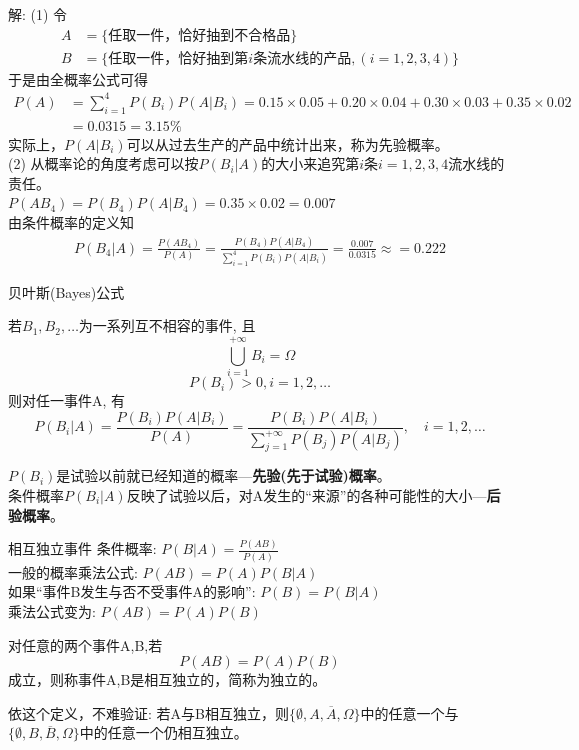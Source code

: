 \begin{frame}[shrink]
解: (1) 令
\begin{align*}
A&=\{\text{任取一件，恰好抽到不合格品} \}\\
B&=\{\text{任取一件，恰好抽到第$i$条流水线的产品}, (i=1,2,3,4) \}
\end{align*}
于是由全概率公式可得
\begin{align*}
P(A)&=\sum\limits_{i=1}^4P(B_i)P(A|B_i)=0.15\times 0.05+0.20\times 0.04+0.30\times 0.03+0.35\times 0.02\\
&=0.0315=3.15\%
\end{align*}
实际上，$P(A|B_i)$可以从过去生产的产品中统计出来，称为先验概率。\\
(2) 从概率论的角度考虑可以按$P(B_i|A)$的大小来追究第$i$条$i=1,2,3,4$流水线的责任。\\
$P(AB_4)=P(B_4)P(A|B_4)=0.35\times 0.02=0.007$\\
由条件概率的定义知
\begin{align*}
P(B_4|A)=\frac{P(AB_4)}{P(A)}=\frac{P(B_4)P(A|B_4)}{\sum\limits_{i=1}^4P(B_i)P(A|B_i)}=\frac{0.007}{0.0315}\approx=0.222
\end{align*}
\end{frame}

\begin{frame}{贝叶斯(Bayes)公式}
\begin{theorem}
	若$B_1, B_2, \dots$为一系列互不相容的事件, 且
	\[\bigcup\limits_{i=1}^{+\infty}B_i=\Omega \]
	\[P(B_i)>0, i=1,2,\dots \]
	则对任一事件A, 有
	\[P(B_i|A)=\frac{P(B_i)P(A|B_i)}{P(A)}=\frac{P(B_i)P(A|B_i)}{\sum\limits_{j=1}^{+\infty}P(B_j)P(A|B_j)}, \quad i=1,2,\dots \]
\end{theorem}
$P(B_i)$是试验以前就已经知道的概率---\textbf{先验(先于试验)概率}。\\
条件概率$P(B_i|A)$反映了试验以后，对A发生的``来源''的各种可能性的大小---\textbf{后验概率}。
\end{frame}

\begin{frame}{相互独立事件}
条件概率: $P(B|A)=\frac{P(AB)}{P(A)}$\\
一般的概率乘法公式: $P(AB)=P(A)P(B|A)$\\
如果``事件B发生与否不受事件A的影响'': $P(B)=P(B|A)$\\
乘法公式变为: $P(AB)=P(A)P(B)$
\begin{definition}
对任意的两个事件A,B,若
\[P(AB)=P(A)P(B)\]
成立，则称事件A,B是相互独立的，简称为独立的。	
\end{definition}
\begin{block}{依这个定义，不难验证:}
	若A与B相互独立，则$\{\emptyset,A,\overline{A},\Omega\}$中的任意一个与$\{\emptyset,B,\overline{B},\Omega\}$中的任意一个仍相互独立。
\end{block}
\end{frame}

